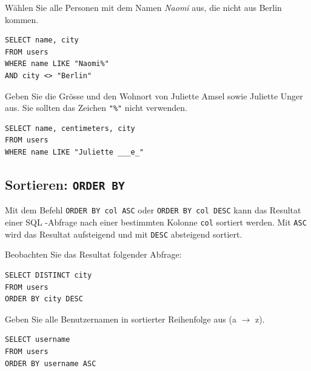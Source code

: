 \begin{myexercise}
  Wählen Sie alle Personen mit dem Namen \textit{Naomi} aus, die nicht aus Berlin kommen.
  \begin{myanswer}
    \begin{lstlisting}
SELECT name, city
FROM users
WHERE name LIKE "Naomi%"
AND city <> "Berlin"
\end{lstlisting}
  \end{myanswer}
\end{myexercise}

\begin{mychallenge}
  Geben Sie die Grösse und den Wohnort von Juliette Amsel sowie Juliette Unger aus. Sie sollten das Zeichen \lstinline|"%"| nicht verwenden.
  \begin{myanswer}
    \begin{lstlisting}
SELECT name, centimeters, city
FROM users
WHERE name LIKE "Juliette ___e_"
\end{lstlisting}
  \end{myanswer}
\end{mychallenge}

\subsection{Sortieren: \texorpdfstring{\lstinline|ORDER BY|}{ORDER BY}}

Mit dem Befehl \lstinline|ORDER BY col ASC| oder \lstinline|ORDER BY col DESC| kann das Resultat einer \gls{SQL} -Abfrage nach einer bestimmten Kolonne \lstinline|col| sortiert werden. Mit \lstinline|ASC| wird das Resultat aufsteigend und mit \lstinline|DESC| absteigend sortiert.

\begin{myexample}
Beobachten Sie das Resultat folgender Abfrage:

\begin{lstlisting}
SELECT DISTINCT city 
FROM users 
ORDER BY city DESC
\end{lstlisting}
\end{myexample}

\begin{myexercise}
  Geben Sie alle Benutzernamen in sortierter Reihenfolge aus (a $\rightarrow$ z).
  \begin{myanswer}
    \begin{lstlisting}
SELECT username
FROM users
ORDER BY username ASC
\end{lstlisting}
  \end{myanswer}
\end{myexercise}

